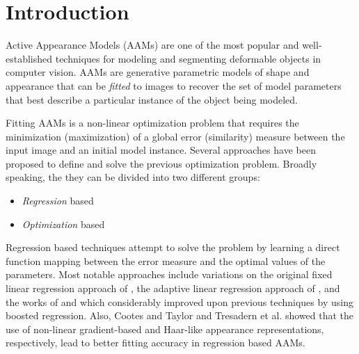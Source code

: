 \section{Introduction}
\label{sec:intro}

Active Appearance Models (AAMs) \cite{Cootes2001, Matthews2004} are one of the most popular and well-established techniques for modeling and segmenting deformable objects in computer vision. AAMs are generative parametric models of shape and appearance that can be \emph{fitted} to images to recover the set of model parameters that best describe a particular instance of the object being modeled.

Fitting AAMs is a non-linear optimization problem that requires the  minimization (maximization) of a global error (similarity) measure between the input image and an initial model instance. Several approaches \cite{Cootes2001, Hou2001, Matthews2004, Batur2005, Gross2005, Donner2006, Papandreou2008, Liu2009, Saragih2009, Amberg2009, Tresadern2010, Martins2010, Sauer2011, Tzimiropoulos2013, Kossaifi2014, Antonakos2014} have been proposed to define and solve the previous optimization problem. Broadly speaking, the they can be divided into two different groups: 
\begin{itemize}
\item \emph{Regression} based \cite{Cootes2001, Hou2001, Batur2005, Donner2006, Saragih2009, Tresadern2010, Sauer2011}
\item \emph{Optimization} based \cite{Matthews2004, Gross2005, Papandreou2008, Amberg2009, Martins2010, Tzimiropoulos2013, Kossaifi2014}
\end{itemize}

Regression based techniques attempt to solve the problem by learning a direct function mapping between the error measure and the optimal values of the parameters. Most notable approaches include variations on the original \cite{Cootes2001} fixed linear regression approach of \cite{Hou2001, Donner2006}, the adaptive linear regression approach of \cite{Batur2005}, and the works of \cite{Saragih2009} and \cite{Tresadern2010} which considerably improved upon previous techniques by using boosted regression. Also, Cootes and Taylor \cite{Cootes2001b} and Tresadern et al. \cite{Tresadern2010} showed that the use of non-linear gradient-based and Haar-like appearance representations, respectively, lead to better fitting accuracy in regression based AAMs. 

